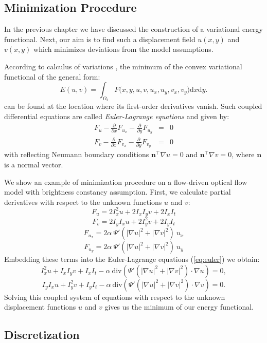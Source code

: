 \subsection{Minimization Procedure}
\label{minimization_procedure}

In the previous chapter we have discussed the construction of a variational energy functional. Next, our aim is to  find such a displacement field $u(x,y)$ and $v(x,y)$ which minimizes deviations from the model assumptions.

According to calculus of variations \cite{elsgolts62}, the minimum of the convex variational functional of the general form:
$$ E(u,v) = \int_{\Omega_{2}}{F(x,y,u, v, u_x, u_y, v_x, v_y})\text{d}x \text{d}y. $$
can be found at the location where its first-order derivatives vanish.
Such coupled differential equations are called \textit{Euler-Lagrange equations} and given by:
\begin{eqnarray}
F_u - \frac{\partial}{\partial x}F_{u_x} - \frac{\partial}{\partial y}F_{u_y} &=& 0 \\  \nonumber 
F_v - \frac{\partial}{\partial x}F_{v_x} - \frac{\partial}{\partial y}F_{v_y} &=& 0 
\label{eq:euler}	
\end{eqnarray}
with reflecting Neumann boundary conditions $\textbf{n}^\top \nabla u = 0$ and $\textbf{n}^\top \nabla v = 0$, where $\textbf{n}$ is a normal vector.


We show an example of minimization procedure on a flow-driven optical flow model with brightness constancy assumption. First, we calculate partial derivatives with respect to the unknown functions $u$ and $v$:
$$ F_u = 2 I^2_x u + 2 I_x I_y v + 2 I_x I_t $$ 
$$ F_v = 2 I_y I_x u + 2 I^2_y v + 2 I_y I_t $$
$$ F_{u_x} = 2 \alpha \: \Psi'(|\nabla u|^2 + |\nabla v|^2) \: u_x$$ 
$$ F_{u_y} = 2 \alpha \: \Psi'(|\nabla u|^2 + |\nabla v|^2) \: u_y$$
Embedding these terms into the Euler-Lagrange equations (\ref{eq:euler}) we obtain:
$$ I^2_x u + I_x I_y v + I_x I_t - \alpha \: \textrm{div} (\Psi'(|\nabla u|^2 + |\nabla v|^2) \cdot \nabla u ) = 0, $$
$$ I_y I_x u + I^2_y v + I_y I_t - \alpha \: \textrm{div} (\Psi'(|\nabla u|^2 + |\nabla v|^2) \cdot \nabla v ) = 0. $$
Solving this coupled system of equations with respect to the unknown displacement functions $u$ and $v$ gives us the minimum of our energy functional. 

\subsection{Discretization}
\label{discretization}

